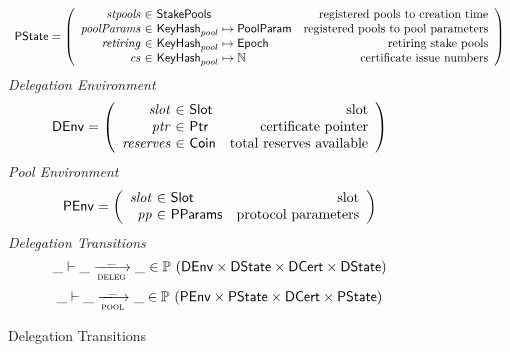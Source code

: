 \begin{figure}
\begin{equation*}
\begin{array}{l}
    \\
    \PState =
    \left(\begin{array}{r@{~\in~}lr}
      \var{stpools} & \StakePools & \text{registered pools to creation time}\\
      \var{poolParams} & \KeyHash_{pool} \mapsto \PoolParam
        & \text{registered pools to pool parameters}\\
      \var{retiring} & \KeyHash_{pool} \mapsto \Epoch & \text{retiring stake pools}\\
      \var{cs} & \KeyHash_{pool} \mapsto \N & \text{certificate issue numbers}\\
    \end{array}\right)
    \end{array}
  \end{equation*}
  \emph{Delegation Environment}
  \begin{equation*}
    \DEnv =
    \left(
      \begin{array}{r@{~\in~}lr}
        \var{slot} & \Slot & \text{slot}\\
        \var{ptr} & \Ptr & \text{certificate pointer}\\
        \var{reserves} & \Coin & \text{total reserves available}
      \end{array}
    \right)
  \end{equation*}
  \emph{Pool Environment}
  \begin{equation*}
    \PEnv =
    \left(
      \begin{array}{r@{~\in~}lr}
        \var{slot} & \Slot & \text{slot}\\
        \var{pp} & \PParams & \text{protocol parameters}\\
      \end{array}
    \right)
  \end{equation*}
  \emph{Delegation Transitions}
  \begin{equation*}
    \_ \vdash \_ \trans{deleg}{\_} \_ \in
      \powerset (\DEnv \times \DState \times \DCert \times \DState)
  \end{equation*}
  \begin{equation*}
    \_ \vdash \_ \trans{pool}{\_} \_ \in
    \powerset (\PEnv \times \PState \times \DCert \times \PState)
  \end{equation*}
  \caption{Delegation Transitions}
  \label{fig:delegation-transitions}
\end{figure}

\clearpage

